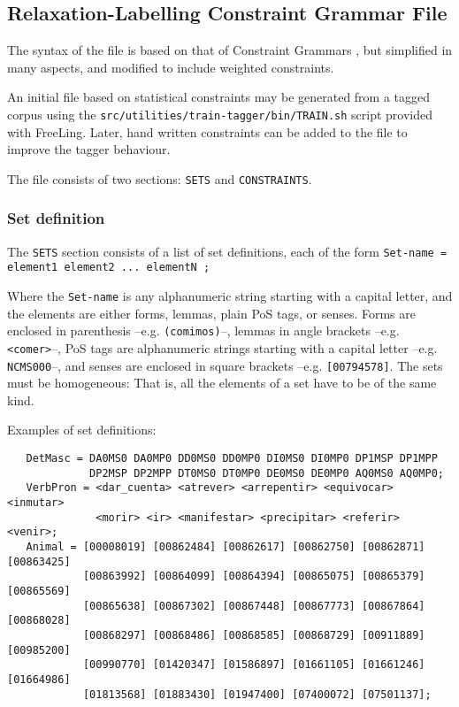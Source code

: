 \documentclass[a4paper]{book}
\begin{document}
\subsection{Relaxation-Labelling Constraint Grammar File}
\label{file-relax}

   The syntax of the file is based on that of Constraint Grammars
   \cite{karlsson95}, but simplified in many aspects, and modified to 
   include weighted constraints.

   An initial file based on statistical constraints may be generated
   from a tagged corpus using the  {\tt src/utilities/train-tagger/bin/TRAIN.sh}
   script provided with FreeLing.
   Later, hand written constraints can be added to the file to improve
   the tagger behaviour.

   The file consists of two sections: {\tt SETS} and {\tt CONSTRAINTS}.

\subsubsection{Set definition}
   The {\tt SETS} section consists of a list of set definitions, each of the form
   {\tt Set-name = element1 element2 ... elementN ; }
    
    Where the {\tt Set-name} is any alphanumeric string starting with
    a capital letter, and the elements are either forms, lemmas, plain
    PoS tags, or senses. Forms are enclosed in parenthesis
    --e.g. \verb#(comimos)#--, lemmas in angle brackets
    --e.g. \verb#<comer>#--, PoS tags are alphanumeric strings
    starting with a capital letter --e.g. \verb#NCMS000#--, and senses
    are enclosed in square brackets --e.g. \verb#[00794578]#.  The
    sets must be homogeneous: That is, all the elements of a set have
    to be of the same kind.

   Examples of set definitions:
\begin{verbatim}
   DetMasc = DA0MS0 DA0MP0 DD0MS0 DD0MP0 DI0MS0 DI0MP0 DP1MSP DP1MPP
             DP2MSP DP2MPP DT0MS0 DT0MP0 DE0MS0 DE0MP0 AQ0MS0 AQ0MP0;
   VerbPron = <dar_cuenta> <atrever> <arrepentir> <equivocar> <inmutar>
              <morir> <ir> <manifestar> <precipitar> <referir> <venir>;
   Animal = [00008019] [00862484] [00862617] [00862750] [00862871] [00863425]
            [00863992] [00864099] [00864394] [00865075] [00865379] [00865569]
            [00865638] [00867302] [00867448] [00867773] [00867864] [00868028]
            [00868297] [00868486] [00868585] [00868729] [00911889] [00985200]
            [00990770] [01420347] [01586897] [01661105] [01661246] [01664986] 
            [01813568] [01883430] [01947400] [07400072] [07501137];
\end{verbatim}
\end{document}
